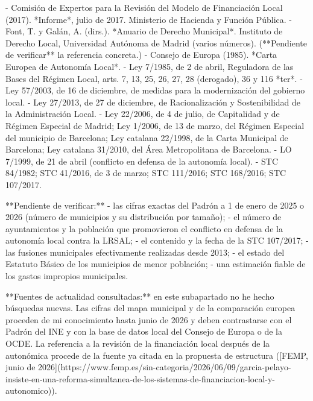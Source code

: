 \documentclass[10pt,a4paper]{article}
\begin{document}
{- Comisión de Expertos para la Revisión del Modelo de Financiación Local (2017). *Informe*, julio de 2017. Ministerio de Hacienda y Función Pública.
- Font, T. y Galán, A. (dirs.). *Anuario de Derecho Municipal*. Instituto de Derecho Local, Universidad Autónoma de Madrid (varios números). (**Pendiente de verificar** la referencia concreta.)
- Consejo de Europa (1985). *Carta Europea de Autonomía Local*.
- Ley 7/1985, de 2 de abril, Reguladora de las Bases del Régimen Local, arts. 7, 13, 25, 26, 27, 28 (derogado), 36 y 116 *ter*.
- Ley 57/2003, de 16 de diciembre, de medidas para la modernización del gobierno local.
- Ley 27/2013, de 27 de diciembre, de Racionalización y Sostenibilidad de la Administración Local.
- Ley 22/2006, de 4 de julio, de Capitalidad y de Régimen Especial de Madrid; Ley 1/2006, de 13 de marzo, del Régimen Especial del municipio de Barcelona; Ley catalana 22/1998, de la Carta Municipal de Barcelona; Ley catalana 31/2010, del Área Metropolitana de Barcelona.
- LO 7/1999, de 21 de abril (conflicto en defensa de la autonomía local).
- STC 84/1982; STC 41/2016, de 3 de marzo; STC 111/2016; STC 168/2016; STC 107/2017.

**Pendiente de verificar:**
- las cifras exactas del Padrón a 1 de enero de 2025 o 2026 (número de municipios y su distribución por tamaño);
- el número de ayuntamientos y la población que promovieron el conflicto en defensa de la autonomía local contra la LRSAL;
- el contenido y la fecha de la STC 107/2017;
- las fusiones municipales efectivamente realizadas desde 2013;
- el estado del Estatuto Básico de los municipios de menor población;
- una estimación fiable de los gastos impropios municipales.

**Fuentes de actualidad consultadas:** en este subapartado no he hecho búsquedas nuevas. Las cifras del mapa municipal y de la comparación europea proceden de mi conocimiento hasta junio de 2026 y deben contrastarse con el Padrón del INE y con la base de datos local del Consejo de Europa o de la OCDE. La referencia a la revisión de la financiación local después de la autonómica procede de la fuente ya citada en la propuesta de estructura ([FEMP, junio de 2026](https://www.femp.es/sin-categoria/2026/06/09/garcia-pelayo-insiste-en-una-reforma-simultanea-de-los-sistemas-de-financiacion-local-y-autonomico)).

}
\end{document}
